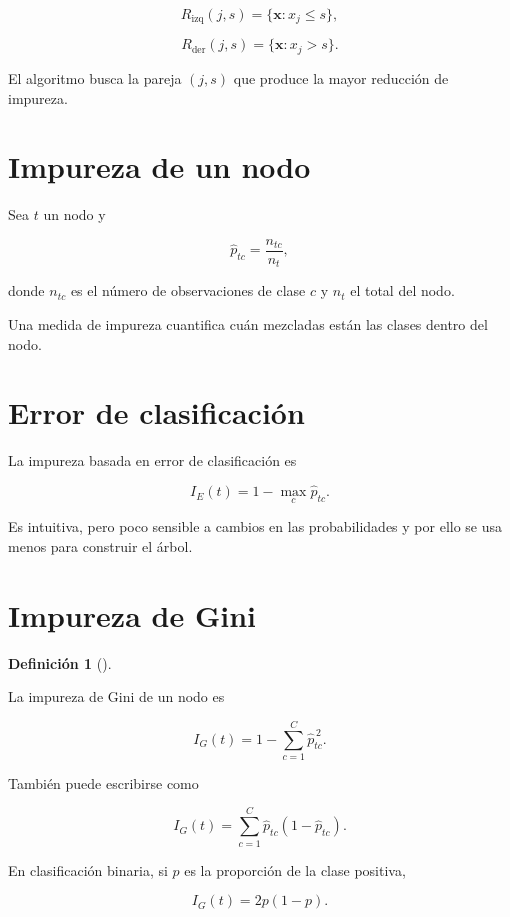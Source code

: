 \documentclass[
  spanish,
  11pt,
  letterpaper,
  DIV=11,
  numbers=noendperiod]{scrreprt}
\theoremstyle{definition}
\newtheorem{definition}{Definición}[chapter]
\theoremstyle{plain}
\theoremstyle{definition}
\theoremstyle{remark}
\begin{document}
\[
R_{\text{izq}}(j,s)
=
\{\mathbf{x}:x_j\leq s\},
\]

\[
R_{\text{der}}(j,s)
=
\{\mathbf{x}:x_j>s\}.
\]

El algoritmo busca la pareja \((j,s)\) que produce la mayor reducción de
impureza.

\section{Impureza de un nodo}\label{impureza-de-un-nodo}

Sea \(t\) un nodo y

\[
\widehat{p}_{tc}
=
\frac{n_{tc}}{n_t},
\]

donde \(n_{tc}\) es el número de observaciones de clase \(c\) y \(n_t\)
el total del nodo.

Una medida de impureza cuantifica cuán mezcladas están las clases dentro
del nodo.

\section{Error de clasificación}\label{error-de-clasificaciuxf3n}

La impureza basada en error de clasificación es

\[
I_E(t)
=
1-\max_c \widehat{p}_{tc}.
\]

Es intuitiva, pero poco sensible a cambios en las probabilidades y por
ello se usa menos para construir el árbol.

\section{Impureza de Gini}\label{impureza-de-gini}

\begin{definition}[]\protect\hypertarget{def-gini}{}\label{def-gini}

La impureza de Gini de un nodo es

\[
I_G(t)
=
1-
\sum_{c=1}^{C}
\widehat{p}_{tc}^{\,2}.
\]

\end{definition}

También puede escribirse como

\[
I_G(t)
=
\sum_{c=1}^{C}
\widehat{p}_{tc}
\left(
1-\widehat{p}_{tc}
\right).
\]

En clasificación binaria, si \(p\) es la proporción de la clase
positiva,

\[
I_G(t)=2p(1-p).
\]
\end{document}
